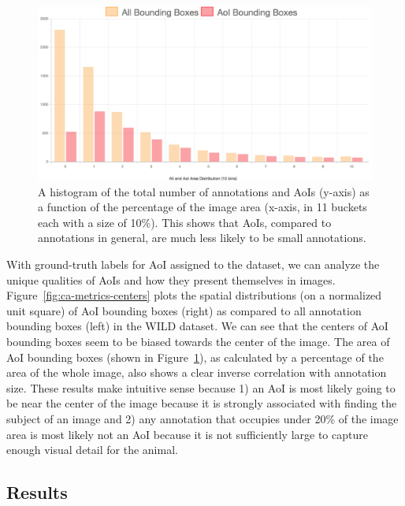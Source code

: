 \begin{figure}[!t]
    \begin{center}
        \vspace{1.0cm}
        \includegraphics[width=0.95\linewidth]{resources/areas.pdf}
    \end{center}
    \caption{A histogram of the total number of annotations and AoIs (y-axis) as a function of the percentage of the image area (x-axis, in 11 buckets each with a size of 10\%).  This shows that AoIs, compared to annotations in general, are much less likely to be small annotations.}
    \label{fig:ca-metrics-area}
\end{figure}

With ground-truth labels for AoI assigned to the dataset, we can analyze the unique qualities of AoIs and how they present themselves in images.  Figure~\ref{fig:ca-metrics-centers} plots the spatial distributions (on a normalized unit square) of AoI bounding boxes (right) as compared to all annotation bounding boxes (left) in the WILD dataset.  We can see that the centers of AoI bounding boxes seem to be biased towards the center of the image.  The area of AoI bounding boxes (shown in Figure~\ref{fig:ca-metrics-area}), as calculated by a percentage of the area of the whole image, also shows a clear inverse correlation with annotation size.  These results make intuitive sense because 1) an AoI is most likely going to be near the center of the image because it is strongly associated with finding the subject of an image and 2) any annotation that occupies under 20\% of the image area is most likely not an AoI because it is not sufficiently large to capture enough visual detail for the animal.

\subsection{Results}

